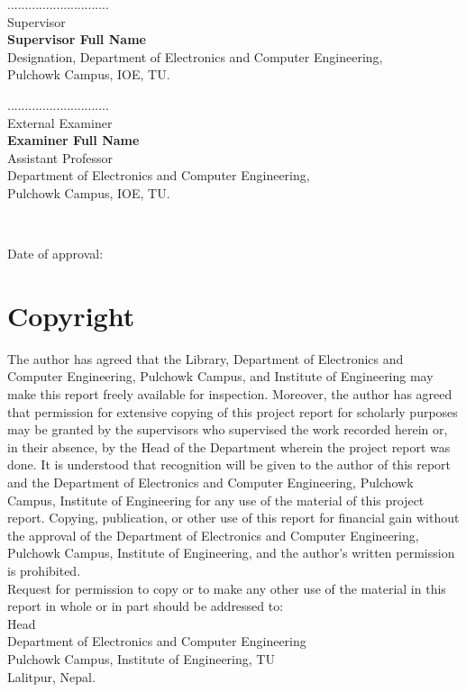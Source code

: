 \documentclass[12pt]{report}
\begin{document}
\vspace{1cm}
\begin{minipage}{.5\textwidth}
    \raggedright
    .............................\\
    Supervisor\\
    \textbf{Supervisor Full Name}\\
    Designation, Department of Electronics and Computer Engineering,\\
    Pulchowk Campus, IOE, TU.\\
\end{minipage}%
\begin{minipage}{0.5\textwidth}
    \raggedleft
    .............................\\
    External Examiner\\
    \textbf{Examiner Full Name}\\
    Assistant Professor\\
    Department of Electronics and Computer Engineering,\\
    Pulchowk Campus, IOE, TU.\\
\end{minipage}\\
\newline
\newline
\newline
\centerline{Date of approval:}

\chapter*{Copyright}
The author has agreed that the Library, Department of Electronics and Computer Engineering, Pulchowk Campus, and Institute of Engineering may make this report freely available for inspection. Moreover, the author has agreed that permission for extensive copying of this project report for scholarly purposes may be granted by the supervisors who supervised the work recorded herein or, in their absence, by the Head of the Department wherein the project report was done. It is understood that recognition will be given to the author of this report and the Department of Electronics and Computer Engineering, Pulchowk Campus, Institute of Engineering for any use of the material of this project report. Copying, publication, or other use of this report for financial gain without the approval of the Department of Electronics and Computer Engineering, Pulchowk Campus, Institute of Engineering, and the author's written permission is prohibited.\\
Request for permission to copy or to make any other use of the material in this report in whole or in part should be addressed to:\\
\newline
\newline
\newline
Head\\
Department of Electronics and Computer Engineering\\
Pulchowk Campus, Institute of Engineering, TU\\
Lalitpur, Nepal.
\end{document}
